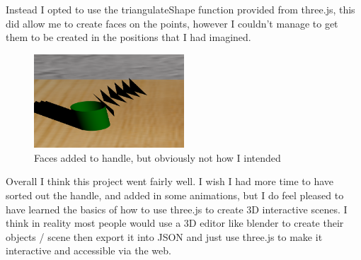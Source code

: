 \documentclass[runningheads,a4paper]{llncs}
\begin{document}
  Instead I opted to use the triangulateShape function provided from three.js, this did allow me to create faces on the points, however I couldn't manage to get them to be created in the positions that I had imagined. 

  \begin{figure}[H]
    \centering
    \includegraphics[width=0.5\textwidth]{images/9.png}
    \caption{Faces added to handle, but obviously not how I intended}
    \label{fig:window}
  \end{figure}

  Overall I think this project went fairly well. I wish I had more time to have sorted out the handle, and added in some animations, but I do feel pleased to have learned the basics of how to use three.js to create 3D interactive scenes. I think in reality most people would use a 3D editor like blender to create their objects / scene then export it into JSON and just use three.js to make it interactive and accessible via the web. 
\end{document}
